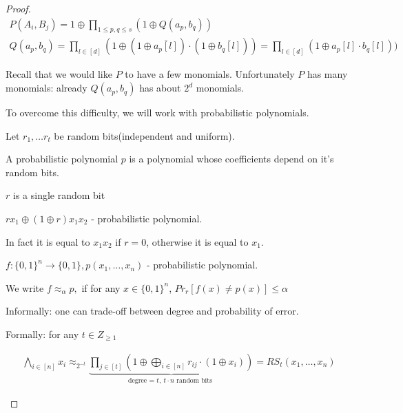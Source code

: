 \begin{proof}
	\begin{align*}
		P(A_i, B_j) = 1 \oplus \prod_{1 \leq p, q \leq s} (1 \oplus Q(a_p, b_q))\\
		Q(a_p, b_q) = \prod_{l \in [d]} (1 \oplus (1 \oplus \overline{a_p[l]}) \cdot (1 \oplus \overline {b_q[l]})) = \prod_{l \in [d]} (1 \oplus a_p[l] \cdot b_q[l]))
	\end{align*}

	Recall that we would like $P$ to have a few monomials.
	Unfortunately $P$ has many monomials: already $Q(a_p, b_q)$ has about $2^{d}$ monomials.

	To overcome this difficulty, we will work with probabilistic polynomials.

	\begin{df}

		Let $r_1, \dots r_t$ be random bits(independent and uniform).

		A probabilistic polynomial $p$ is a polynomial whose coefficients depend on it's random bits.
	\end{df}

	\begin{exmpl}
		$r$ is a single random bit

		$r x_1 \oplus (1 \oplus r) x_1 x_2$ - probabilistic polynomial.

		In fact it is equal to $x_1 x_2$ if $r = 0$, otherwise it is equal to $x_1$.
	\end{exmpl}

	\begin{df}

		$f:\{0, 1\}^{n} \to \{0, 1\}, p(x_1, \dots, x_n)$  - probabilistic polynomial.

		We write $f \approx_\alpha p,$ if for any $x \in \{0, 1\}^{n}$, $Pr_r[f(x) \neq p(x)] \leq \alpha$

	\end{df}

	\begin{lm}

		Informally: one can trade-off between degree and probability of error.

		Formally: for any $t \in Z_{\geq 1}$

		\begin{align*}
			\bigwedge_{i \in [n]} x_i \approx_{2^{-t}} \underbrace{\prod_{j \in [t]}(1 \oplus \bigoplus_{i \in [n]} r_{i j} \cdot (1 \oplus x_i))}_{\text{degree = } t, \ t \cdot n \text{ random bits }} = RS_t(x_1, \dots, x_n)
		\end{align*}


\end{lm}
\end{proof}
